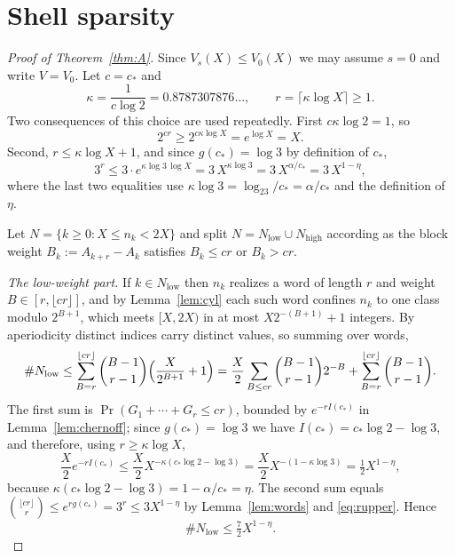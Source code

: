 \documentclass[11pt,reqno]{amsart}
\theoremstyle{plain}
\theoremstyle{definition}
\numberwithin{equation}{section}
\begin{document}
\section{Shell sparsity}
\label{sec:sparsity}

\begin{proof}[Proof of Theorem~\textup{\ref{thm:A}}]
Since $V_s(X)\le V_0(X)$ we may assume $s=0$ and write $V=V_0$.  Let
$c=c_*$ and
\[
\kappa=\frac1{c\log2}=0.8787307876\ldots,
\qquad
r=\lceil\kappa\log X\rceil\ge1 .
\]
Two consequences of this choice are used repeatedly.  First
$c\kappa\log2=1$, so
\begin{equation}\label{eq:rlower}
2^{cr}\ge2^{c\kappa\log X}=e^{\log X}=X .
\end{equation}
Second, $r\le\kappa\log X+1$, and since $g(c_*)=\log3$ by definition of
$c_*$,
\begin{equation}\label{eq:rupper}
3^r\le3\cdot e^{\kappa\log3\,\log X}=3\,X^{\kappa\log3}=3\,X^{\alpha/c_*}
=3\,X^{1-\eta},
\end{equation}
where the last two equalities use $\kappa\log 3=\log_23/c_*=\alpha/c_*$ and
the definition of $\eta$.

Let $N=\{k\ge0:X\le n_k<2X\}$ and split $N=N_{\mathrm{low}}\cup
N_{\mathrm{high}}$ according as the block weight
$B_k:=A_{k+r}-A_k$ satisfies $B_k\le cr$ or $B_k>cr$.

\smallskip
\emph{The low-weight part.}  If $k\in N_{\mathrm{low}}$ then $n_k$ realizes a
word of length $r$ and weight $B\in[r,\lfloor cr\rfloor]$, and by
Lemma~\ref{lem:cyl} each such word confines $n_k$ to one class modulo
$2^{B+1}$, which meets $[X,2X)$ in at most $X2^{-(B+1)}+1$ integers.  By
aperiodicity distinct indices carry distinct values, so summing over words,
\[
\#N_{\mathrm{low}}
\le\sum_{B=r}^{\lfloor cr\rfloor}\binom{B-1}{r-1}
\Bigl(\frac X{2^{B+1}}+1\Bigr)
=\frac X2\sum_{B\le cr}\binom{B-1}{r-1}2^{-B}
+\sum_{B=r}^{\lfloor cr\rfloor}\binom{B-1}{r-1}.
\]
The first sum is $\Pr(G_1+\cdots+G_r\le cr)$, bounded by $e^{-rI(c_*)}$
in Lemma~\ref{lem:chernoff}; since $g(c_*)=\log3$ we have
$I(c_*)=c_*\log2-\log3$, and therefore, using $r\ge\kappa\log X$,
\[
\frac X2e^{-rI(c_*)}
\le\frac X2X^{-\kappa(c_*\log2-\log3)}
=\frac X2X^{-(1-\kappa\log3)}
=\tfrac12X^{1-\eta},
\]
because $\kappa(c_*\log2-\log3)=1-\alpha/c_*=\eta$.  The second sum equals
$\binom{\lfloor c r\rfloor}r\le e^{rg(c_*)}=3^r\le3X^{1-\eta}$ by
Lemma~\ref{lem:words} and \eqref{eq:rupper}.  Hence
\[
\#N_{\mathrm{low}}\le\tfrac72X^{1-\eta}.
\]


\end{proof}
\end{document}
